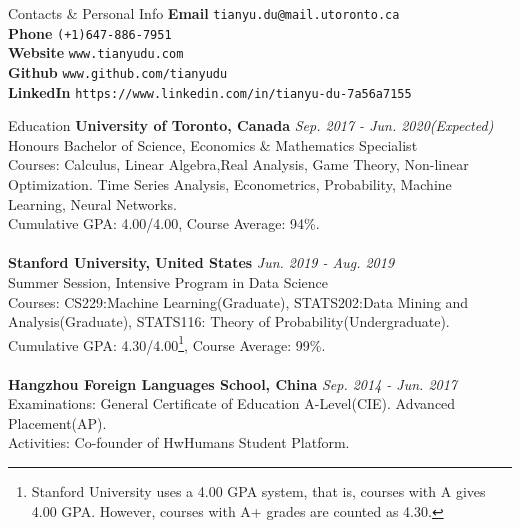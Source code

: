 \documentclass{resume} %
\begin{document}

\begin{rSection}{Contacts \& Personal Info}
	\textbf{Email} \texttt{tianyu.du@mail.utoronto.ca}
	\\
	\textbf{Phone} \texttt{(+1)647-886-7951}
	\\
	\textbf{Website} \texttt{www.tianyudu.com}
	\\
	\textbf{Github} \texttt{www.github.com/tianyudu}
	\\
	\textbf{LinkedIn} \texttt{https://www.linkedin.com/in/tianyu-du-7a56a7155}
\end{rSection}


\begin{rSection}{Education}
{\bf University of Toronto, Canada} \hfill {\em Sep. 2017 - Jun. 2020(Expected)} 
\\ Honours Bachelor of Science, Economics \& Mathematics Specialist
\\ Courses: Calculus, Linear Algebra,Real Analysis, Game Theory, Non-linear Optimization. Time Series Analysis, Econometrics, Probability, Machine Learning, Neural Networks.
\\ Cumulative GPA: 4.00/4.00, Course Average: 94\%.
\\
\\{\bf Stanford University, United States} \hfill {\em Jun. 2019 - Aug. 2019} 
\\ Summer Session, Intensive Program in Data Science
\\ Courses: CS229:Machine Learning(Graduate), STATS202:Data Mining and Analysis(Graduate), STATS116: Theory of Probability(Undergraduate).
\\ Cumulative GPA: 4.30/4.00\footnote{Stanford University uses a 4.00 GPA system, that is, courses with A gives 4.00 GPA. However, courses with A+ grades are counted as 4.30.}, Course Average: 99\%.
\\
\\{\bf Hangzhou Foreign Languages School, China} \hfill {\em Sep. 2014 - Jun. 2017} 
\\ Examinations: General Certificate of Education A-Level(CIE). Advanced Placement(AP).
\\ Activities: Co-founder of HwHumans Student Platform.
\end{rSection}
\end{document}
